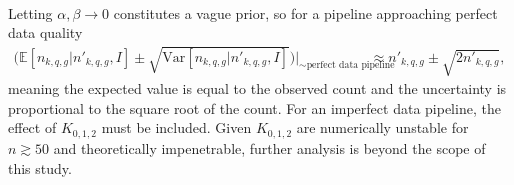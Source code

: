 \begin{example}
\begin{equation}
\begin{split}
		\end{split}
	\end{equation}
	Letting $\alpha,\beta \rightarrow 0$ constitutes a vague prior, so for a pipeline approaching perfect data quality
	\begin{equation}
		\begin{split}
			\bigg(\mathbb{E}[n_{k,q,g}|n'_{k,q,g},I]\pm \sqrt{\text{Var}[n_{k,q,g}|n'_{k,q,g},I]}\bigg)\bigg|_{\sim \text{perfect data pipeline}}&\approx n'_{k,q,g}\pm \sqrt{2n'_{k,q,g}},
		\end{split}
		\label{pp2}
	\end{equation}	
	meaning the expected value is equal to the observed count and the uncertainty is proportional to the square root of the count. For an imperfect data pipeline, the effect of $K_{0,1,2}$ must be included. Given $K_{0,1,2}$ are numerically unstable for $n\gtrsim 50$ and theoretically impenetrable, further analysis is beyond the scope of this study.
\end{example}

